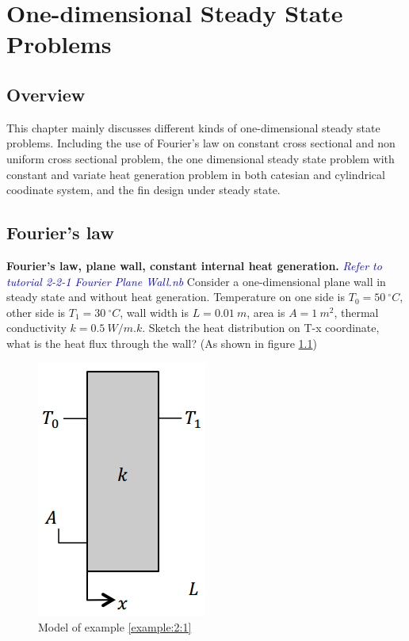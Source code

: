 \newtheorem{problem}{Problem}[section]

\chapter{One-dimensional Steady State Problems}

\section{Overview}
This chapter mainly discusses different kinds of one-dimensional steady state problems. Including the use of Fourier’s law on constant cross sectional and non uniform cross sectional problem, the one dimensional steady state problem with constant and variate heat generation problem in both catesian and cylindrical coodinate system, and the fin design under steady state.
\section{Fourier's law}
\begin{example}
\label{example:2:1}
\textbf{Fourier’s law, plane wall, constant internal heat
generation.} \textcolor{blue} {\emph{Refer to tutorial 2-2-1 Fourier Plane Wall.nb}} Consider a one-dimensional plane wall in steady state and without heat generation.
Temperature on one side is $T_0=50~^\circ C$, other side is $T_1=30~^\circ C$, wall width is $L=0.01~m$,
area is $A=1~m^2$, thermal conductivity $k=0.5~W/m.k$. Sketch the heat distribution on T-x coordinate,
what is the heat flux  through the wall? (As shown in figure \ref{fig:2:1})
\begin{figure}[h!]
  \centering
    \includegraphics[scale=0.6]{figures/ch2/1}
    \caption{Model of example \ref{example:2:1}}
    \label{fig:2:1}
\end{figure}
\end{example}

